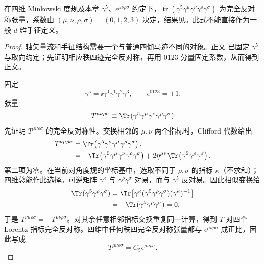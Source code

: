 \begin{lemma}
在四维 Minkowski 度规及本章 $\gamma^5$、$\epsilon^{\mu\nu\rho\sigma}$ 约定下，$\operatorname{tr}(\gamma^5\gamma^\mu\gamma^\nu\gamma^\rho\gamma^\sigma)$ 为完全反对称张量，系数由 $(\mu,\nu,\rho,\sigma)=(0,1,2,3)$ 决定，结果见。此式不能直接作为一般 $d$ 维手征定义。
\end{lemma}

\begin{proof}
轴矢量流和手征结构需要一个与普通四伽马迹不同的对象。正文 已固定 $\gamma^5$ 与取向约定；先证明相应秩四迹完全反对称，再用 $0123$ 分量固定系数，从而得到正文。



固定
\begin{equation*}
 \gamma^5=\ii\gamma^0\gamma^1\gamma^2\gamma^3,
 \qquad \epsilon^{0123}=+1.
\end{equation*}
张量
\begin{equation*}
 T^{\mu\nu\rho\sigma}
 \equiv\Tr(\gamma^5\gamma^\mu\gamma^\nu\gamma^\rho\gamma^\sigma)
\end{equation*}
先证明 $T^{\mu\nu\rho\sigma}$ 的完全反对称性。交换相邻的 $\mu,\nu$ 两个指标时，Clifford 代数给出
\begin{align*}
T^{\nu\mu\rho\sigma}
&=\Tr\!\left(\gamma^5\gamma^\nu\gamma^\mu\gamma^\rho\gamma^\sigma\right),\\
&=-\Tr\!\left(\gamma^5\gamma^\mu\gamma^\nu\gamma^\rho\gamma^\sigma\right)
+2\eta^{\mu\nu}\Tr\!\left(\gamma^5\gamma^\rho\gamma^\sigma\right).
\end{align*}
第二项为零。在当前对角度规的坐标基中，选取不同于 $\rho,\sigma$ 的指标 $\kappa$（不求和）；四维总能作此选择。可逆矩阵 $\gamma^\kappa$ 与 $\gamma^\rho\gamma^\sigma$ 对易，而与 $\gamma^5$ 反对易。因此相似变换给
\begin{align*}
\Tr(\gamma^5\gamma^\rho\gamma^\sigma)
&=\Tr\!\left[\gamma^\kappa(\gamma^5\gamma^\rho\gamma^\sigma)(\gamma^\kappa)^{-1}\right]\\
&=-\Tr(\gamma^5\gamma^\rho\gamma^\sigma)=0.
\end{align*}
于是
$T^{\nu\mu\rho\sigma}=-T^{\mu\nu\rho\sigma}$。对其余任意相邻指标交换重复同一计算，得到 $T$ 对四个 Lorentz 指标完全反对称。四维中任何秩四完全反对称张量都与 $\epsilon^{\mu\nu\rho\sigma}$ 成正比，因此写成
\begin{equation*}
T^{\mu\nu\rho\sigma}=C_5\epsilon^{\mu\nu\rho\sigma}.
\end{equation*}

\end{proof}
